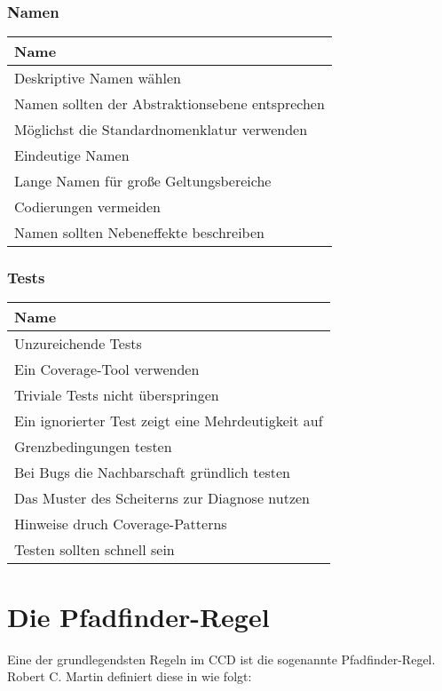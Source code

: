 \subsubsection{Namen}

\begin{table}[H]
	\centering
		 \begin{tabular}{ | l | }
		 \hline
			Name \\  \hline
			Deskriptive Namen wählen \\
			Namen sollten der Abstraktionsebene entsprechen \\
			Möglichst die Standardnomenklatur verwenden \\
			Eindeutige Namen \\
			Lange Namen für große Geltungsbereiche \\
			Codierungen vermeiden \\
			Namen sollten Nebeneffekte beschreiben \\ \hline
		\end{tabular}
	\label{tab:SmellsUndHeuristiken_Naming}
\end{table}


\subsubsection{Tests}

\begin{table}[H]
	\centering
		 \begin{tabular}{ | l | }
		 \hline
			Name \\  \hline
			Unzureichende Tests \\
			Ein Coverage-Tool verwenden \\
			Triviale Tests nicht überspringen \\
			Ein ignorierter Test zeigt eine Mehrdeutigkeit auf \\
			Grenzbedingungen testen \\
			Bei Bugs die Nachbarschaft gründlich testen \\
			Das Muster des Scheiterns zur Diagnose nutzen \\
			Hinweise druch Coverage-Patterns \\
			Testen sollten schnell sein \\ \hline
		\end{tabular}
	\label{tab:SmellsUndHeuristiken_Tests}
\end{table}


\section{Die Pfadfinder-Regel}
Eine der grundlegendsten Regeln im CCD ist die sogenannte Pfadfinder-Regel. Robert C. Martin definiert diese in \cite{Martin2008} wie folgt:


